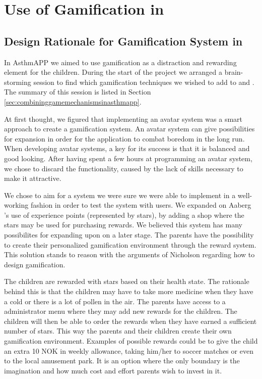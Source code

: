 \section{Use of Gamification in \app{}}
\label{sec:useofgamificationinapp}

\subsection{Design Rationale for Gamification System in \app{}}
\label{sec:designrationalegamification}
In AsthmAPP we aimed to use gamification as a distraction and rewarding element for the children. During the start of the project we arranged a brain-storming session to find which gamification techniques we wished to add to \app{} and \ab{}. The summary of this session is listed in Section \ref{sec:combininggamemechanismsinasthmapp}. 

At first thought, we figured that implementing an avatar system was a smart approach to create a gamification system. An avatar system can give possibilities for expansion in order for the application to combat boredom in the long run. When developing avatar systems, a key for its success is that it is balanced and good looking. After having spent a few hours at programming an avatar system, we chose to discard the functionality, caused by the lack of skills necessary to make it attractive. 

We chose to aim for a system we were sure we were able to implement in a well-working fashion in order to test the system with users. We expanded on Aaberg \etal{}'s use of experience points (represented by stars), by adding a shop where the stars may be used for purchasing rewards. We believed this system has many possibilites for expanding upon on a later stage. The parents have the possibility to create their personalized gamification environment through the reward system. This solution stands to reason with the arguments of Nicholson regarding how to design gamification\cite{nicholson2012user}.

The children are rewarded with stars based on their health state. The rationale behind this is that the children may have to take more medicine when they have a cold or there is a lot of pollen in the air. The parents have access to a administrator menu where they may add new rewards for the children. The children will then be able to order the rewards when they have earned a sufficient number of stars. This way the parents and their children create their own gamification environment. Examples of possible rewards could be to give the child an extra 10 NOK in weekly allowance, taking him/her to soccer matches or even to the local amusement park. It is an option where the only boundary is the imagination and how much cost and effort parents wish to invest in it.    

